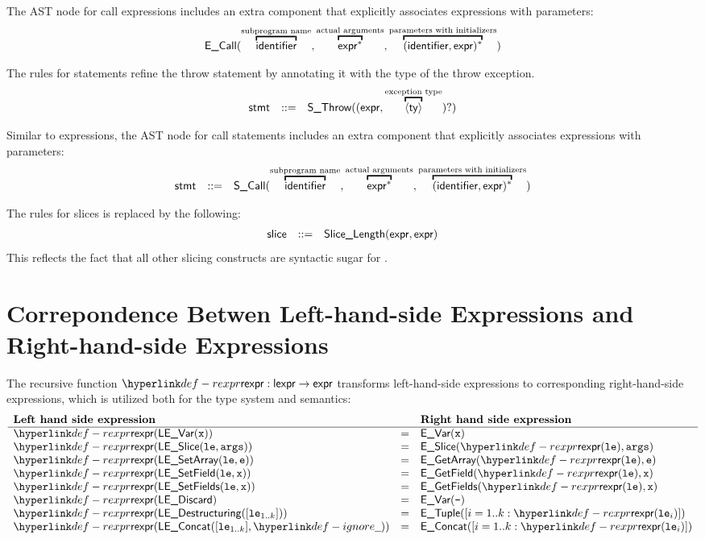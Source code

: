 \documentclass{book}
\begin{document}
The AST node for call expressions includes an extra component that explicitly associates expressions
with parameters:
\[
\begin{array}{rcl}
\ECall(\overtext{\identifier}{subprogram name}, \overtext{\expr^{*}}{actual arguments}, \overtext{(\identifier, \expr)^{*}}{parameters with initializers})
\end{array}
\]

The rules for statements refine the throw statement by annotating it with
the type of the throw exception.
\[
\begin{array}{rcl}
\stmt &::=& \SThrow((\expr, \overtext{\langle\ty\rangle}{exception type})?)
\end{array}
\]

Similar to expressions, the AST node for call statements includes an extra component that explicitly associates expressions
with parameters:
\[
\begin{array}{rcl}
  \stmt &::=&  \SCall(\overtext{\identifier}{subprogram name}, \overtext{\expr^{*}}{actual arguments}, \overtext{(\identifier, \expr)^{*}}{parameters with initializers})
\end{array}
\]


The rules for slices is replaced by the following:
\[
\begin{array}{rcl}
\textsf{slice} &::=& \textsf{Slice\_Length}(\textsf{expr}, \textsf{expr}) \\
\end{array}
\]
This reflects the fact that all other slicing constructs are syntactic sugar
for \SliceLength.

\chapter{Correpondence Betwen Left-hand-side Expressions and Right-hand-side Expressions
\label{ch:LeftToRight}}

The recursive function $\torexpr : \lexpr \rightarrow \expr$ transforms
left-hand-side expressions to corresponding right-hand-side expressions,
which is utilized both for the type system and semantics:
\[
\begin{array}{lcl}
  \textbf{Left hand side expression} & & \textbf{Right hand side expression}\\
  \hline
  \torexpr(\LEVar(\vx)) &=& \EVar(\vx)\\
  \torexpr(\LESlice(\vle, \vargs)) &=& \ESlice(\torexpr(\vle), \vargs)\\
  \torexpr(\LESetArray(\vle, \ve)) &=& \EGetArray(\torexpr(\vle), \ve)\\
  \torexpr(\LESetField(\vle, \vx)) &=& \EGetField(\torexpr(\vle), \vx)\\
  \torexpr(\LESetFields(\vle, \vx)) &=& \EGetFields(\torexpr(\vle), \vx)\\
  \torexpr(\LEDiscard) &=& \EVar(\texttt{-})\\
  \torexpr(\LEDestructuring([\vle_{1..k}])) &=& \ETuple([i=1..k: \torexpr(\vle_i)])\\
  \torexpr(\LEConcat([\vle_{1..k}], \Ignore)) &=& \EConcat([i=1..k: \torexpr(\vle_i)])\\
\end{array}
\]
\end{document}
